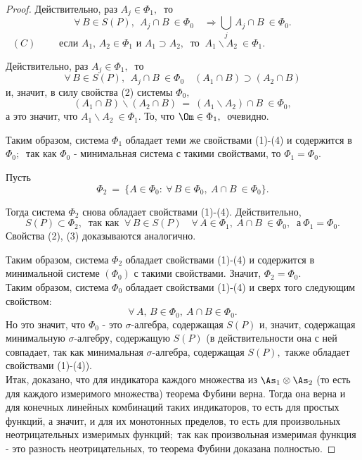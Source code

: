 \documentclass[a4paper]{article}
\begin{document}
\begin{proof}
Действительно, раз $A_j \in \Phi_1,\ $ то
$$
\forall \, B\in S(P), \ \ A_j \cap B \ \in \Phi_0\quad
\Longrightarrow \bigcup\limits_{j}\, A_j\cap B \ \in \Phi_0.
$$
$$
(C) \qquad \mbox{ если  $A_1, \, A_2 \in \Phi_1$ и $A_1 \supset
A_2,\ $ то } \ A_1\backslash A_2\ \in
\Phi_1.\qquad\qquad\qquad\qquad\quad
$$

Действительно, раз $A_j \in \Phi_1,\ $ то
$$
\forall \, B\in S(P), \ \ A_j \cap B \ \in \Phi_0\quad (A_1 \cap
B) \supset (A_2\cap B)
$$
и, значит, в силу свойства (2) системы $\Phi_0,$
$$
(A_1 \cap B) \backslash (A_2\cap B)\ = \ (A_1 \backslash A_2) \cap
B \ \in \Phi_0,
$$
а это значит, что $A_1\backslash A_2\ \in \Phi_1.$ То, что $\Om
\in \Phi_1,\ $ очевидно.

Таким образом, система $\Phi_1$ обладает теми же свойствами
(1)-(4) и содержится в $\Phi_0;\ $ так как $\Phi_0$ - минимальная
система с такими свойствами, то $\Phi_1 = \Phi_0.$

Пусть
$$
\Phi_2\ = \ \{A\in \Phi_0\colon \ \forall \, B \in \Phi_0, \ A
\cap B \ \in \Phi_0\}.
$$

Тогда система $\Phi_2$ снова обладает свойствами (1)-(4).
Действительно,
$$
S(P) \subset \Phi_2, \ \mbox{ так как } \ \forall \, B\in S(P)
\quad \forall \, A \in \Phi_1, \ A\cap B \ \in \Phi_0,\ \mbox{ а
}\  \Phi_1 = \Phi_0.
$$
Свойства (2), (3) доказываются аналогично.

Таким образом, система $\Phi_2$ обладает свойствами (1)-(4) и
содержится в минимальной системе $(\Phi_0)$ с такими свойствами.
Значит, $\Phi_2 = \Phi_0.$\\

Таким образом, система $\Phi_0$ обладает свойствами (1)-(4) и
сверх того следующим свойством:
$$
\forall \, A,\, B \in \Phi_0,\ A\cap B \in \Phi_0.
$$
Но это значит, что $\Phi_0$ - это $\sigma$-алгебра, содержащая
$S(P)$ и, значит, содержащая минимальную $\sigma$-алгебру,
содержащую $S(P)$ (в действительности она с ней совпадает, так как
минимальная $\sigma$-алгебра, содержащая $S(P),$ также обладает
свойствами (1)-(4)).\\

Итак, доказано, что для индикатора каждого множества из
$\As_1 \otimes \As_2$ (то есть для каждого
измеримого множества) теорема Фубини верна. Тогда она верна и для
конечных линейных комбинаций таких индикаторов, то есть для
простых функций, а значит, и для их монотонных пределов, то есть
для произвольных неотрицательных измеримых функций;\ так как
произвольная измеримая функция - это разность неотрицательных, то
теорема Фубини доказана полностью.

\end{proof}
\end{document}
